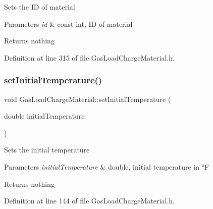Sets the ID of material


\begin{DoxyParams}{Parameters}
{\em id} & const int, ID of material\\
\hline
\end{DoxyParams}
\begin{DoxyReturn}{Returns}
nothing 
\end{DoxyReturn}


Definition at line 315 of file Gas\+Load\+Charge\+Material.\+h.

\mbox{\label{class_gas_load_charge_material_aec9ddfce5e31099b6a047e3d98d80d47}} 
\subsubsection{\texorpdfstring{set\+Initial\+Temperature()}{setInitialTemperature()}\hspace{0.1cm}{\footnotesize\ttfamily [1/3]}}
{\footnotesize\ttfamily void Gas\+Load\+Charge\+Material\+::set\+Initial\+Temperature (\begin{DoxyParamCaption}\item[{double}]{initial\+Temperature }\end{DoxyParamCaption})\hspace{0.3cm}{\ttfamily [inline]}}

Sets the initial temperature


\begin{DoxyParams}{Parameters}
{\em initial\+Temperature} & double, initial temperature in °F\\
\hline
\end{DoxyParams}
\begin{DoxyReturn}{Returns}
nothing 
\end{DoxyReturn}


Definition at line 144 of file Gas\+Load\+Charge\+Material.\+h.

\mbox{\label{class_gas_load_charge_material_aec9ddfce5e31099b6a047e3d98d80d47}} 

